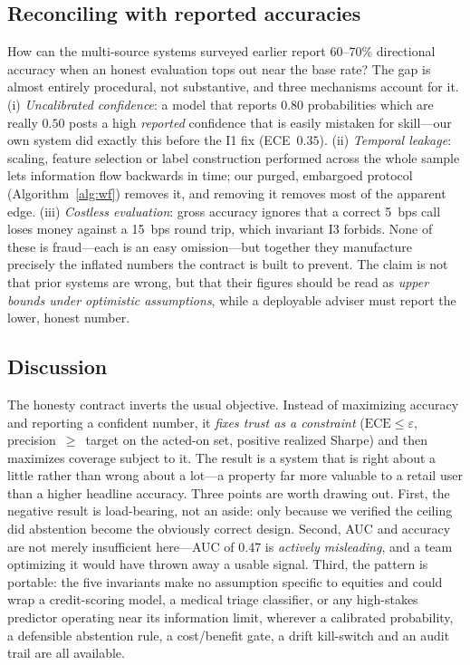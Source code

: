 \documentclass[conference]{IEEEtran}
\begin{document}
\subsection{Reconciling with reported accuracies}
How can the multi-source systems surveyed earlier report
60--70\% directional accuracy \cite{nti2021,long2024,fu2024,moodi2024,farhadi2025}
when an honest evaluation tops out near the base rate? The gap is almost entirely
procedural, not substantive, and three mechanisms account for it. (i)
\emph{Uncalibrated confidence}: a model that reports $0.80$ probabilities which are
really $0.50$ posts a high \emph{reported} confidence that is easily mistaken for
skill---our own system did exactly this before the I1 fix (ECE~$0.35$). (ii)
\emph{Temporal leakage}: scaling, feature selection or label construction performed
across the whole sample lets information flow backwards in time; our purged,
embargoed protocol (Algorithm~\ref{alg:wf}) removes it, and removing it removes most
of the apparent edge. (iii) \emph{Costless evaluation}: gross accuracy ignores that
a correct 5~bps call loses money against a 15~bps round trip, which invariant I3
forbids. None of these is fraud---each is an easy omission---but together they
manufacture precisely the inflated numbers the contract is built to prevent. The
claim is not that prior systems are wrong, but that their figures should be read as
\emph{upper bounds under optimistic assumptions}, while a deployable adviser must
report the lower, honest number.

\subsection{Discussion}
The honesty contract inverts the usual objective. Instead of maximizing accuracy
and reporting a confident number, it \emph{fixes trust as a constraint}
($\mathrm{ECE}\le\varepsilon$, precision~$\ge$~target on the acted-on set, positive
realized Sharpe) and then maximizes coverage subject to it. The result is a system
that is right about a little rather than wrong about a lot---a property far more
valuable to a retail user than a higher headline accuracy. Three points are worth
drawing out. First, the negative result is load-bearing, not an aside: only because
we verified the ceiling did abstention become the obviously correct design.
Second, AUC and accuracy are not merely insufficient here---AUC of 0.47 is
\emph{actively misleading}, and a team optimizing it would have thrown away a
usable signal. Third, the pattern is portable: the five invariants make no
assumption specific to equities and could wrap a credit-scoring model, a medical
triage classifier, or any high-stakes predictor operating near its information
limit, wherever a calibrated probability, a defensible abstention rule, a
cost/benefit gate, a drift kill-switch and an audit trail are all available.
\end{document}
